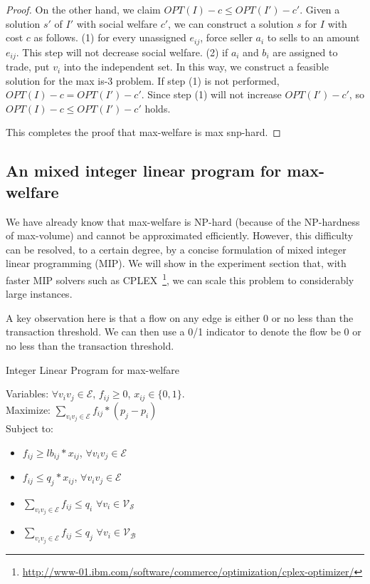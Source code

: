 \documentclass{aamas2015}
\begin{document}
\begin{proof}
	On the other hand, we claim $OPT(I)-c\leq OPT(I')-c'$.
	Given a solution $s'$ of $I'$ with social welfare $c'$, we can construct a solution $s$ for $I$  with cost $c$ as follows.
	(1) for every unassigned $e_{ij}$, force seller $a_i$ to sells to an amount $e_{ij}$. This step will not decrease social welfare.
	(2) if $a_i$ and $b_i$ are assigned to trade, put $v_i$ into the independent set.
	In this way, we construct a feasible solution for the {\sc  max is-3} problem.
	If step (1) is not performed, $OPT(I)-c=OPT(I')-c'$.
	Since step (1) will not increase $OPT(I')-c'$, so $OPT(I)-c\leq OPT(I')-c'$ holds.
	
	This completes the proof that {max-welfare} is {\sc max snp-hard}.
\end{proof}
\subsection{An mixed integer linear program for  {\sc max-welfare}}

We have already know that {\sc max-welfare} is {\sc NP-hard} (because of the {\sc NP-hardness} of {\sc max-volume}) and cannot be approximated efficiently. However, this difficulty can be resolved, to a certain degree, by a concise formulation of mixed integer linear programming (MIP). We will show in the experiment section that, with faster MIP solvers such as {\sc CPLEX}~\footnote{\url{http://www-01.ibm.com/software/commerce/optimization/cplex-optimizer/}}, we can scale this problem to considerably large instances.

A key observation here is that a flow on any edge is either 0 or no less than the transaction threshold. We can then use a 0/1 indicator to denote the flow be 0 or no less than the transaction threshold.

\begin{algorithm}\label{alg:ilp}
	\caption{Integer Linear Program for {\sc max-welfare}}
	Variables: $\forall v_iv_j\in \mathcal{E}$, $f_{ij}\geq 0$, $x_{ij}\in \{0,1\}$.\\
	Maximize: $\sum_{v_iv_j\in \mathcal{E}}f_{ij}*(p_j-p_i) $\\
	Subject to: \\
	\begin{itemize}
		\item $f_{ij}\geq lb_{ij}*x_{ij}$, $ \forall v_iv_j\in \mathcal{E}$
		\item $f_{ij}\leq q_j*x_{ij}$, $ \forall v_iv_j\in \mathcal{E}$
		\item $\sum_{v_iv_j\in \mathcal{E}}f_{ij}\leq q_i$ $\forall  v_i\in \mathcal{V_S}$\\
		\item $\sum_{v_iv_j\in \mathcal{E}}f_{ij}\leq q_j$ $\forall  v_i\in \mathcal{V_B}$\\
	\end{itemize}
\end{algorithm}
\end{document}
